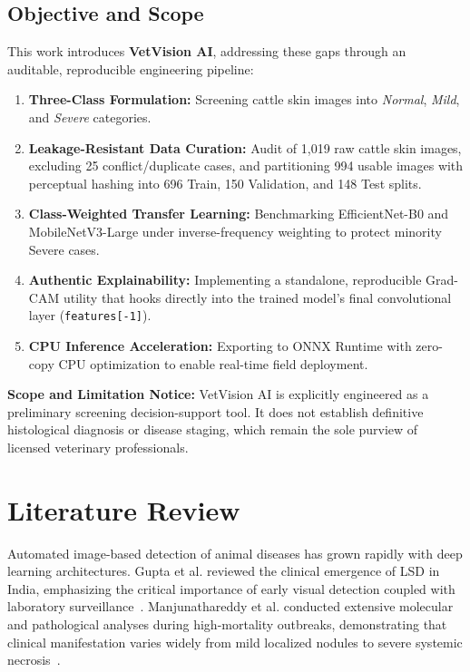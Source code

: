 \documentclass[conference]{IEEEtran}
\begin{document}
\subsection{Objective and Scope}
This work introduces \textbf{VetVision AI}, addressing these gaps through an auditable, reproducible engineering pipeline:
\begin{enumerate}
    \item \textbf{Three-Class Formulation:} Screening cattle skin images into \textit{Normal}, \textit{Mild}, and \textit{Severe} categories.
    \item \textbf{Leakage-Resistant Data Curation:} Audit of 1,019 raw cattle skin images, excluding 25 conflict/duplicate cases, and partitioning 994 usable images with perceptual hashing into 696 Train, 150 Validation, and 148 Test splits.
    \item \textbf{Class-Weighted Transfer Learning:} Benchmarking EfficientNet-B0 and MobileNetV3-Large under inverse-frequency weighting to protect minority Severe cases.
    \item \textbf{Authentic Explainability:} Implementing a standalone, reproducible Grad-CAM utility that hooks directly into the trained model's final convolutional layer (\texttt{features[-1]}).
    \item \textbf{CPU Inference Acceleration:} Exporting to ONNX Runtime with zero-copy CPU optimization to enable real-time field deployment.
\end{enumerate}

\textbf{Scope and Limitation Notice:} VetVision AI is explicitly engineered as a preliminary screening decision-support tool. It does not establish definitive histological diagnosis or disease staging, which remain the sole purview of licensed veterinary professionals.

\section{Literature Review}

Automated image-based detection of animal diseases has grown rapidly with deep learning architectures. Gupta et al. reviewed the clinical emergence of LSD in India, emphasizing the critical importance of early visual detection coupled with laboratory surveillance~\cite{gupta2020review}. Manjunathareddy et al. conducted extensive molecular and pathological analyses during high-mortality outbreaks, demonstrating that clinical manifestation varies widely from mild localized nodules to severe systemic necrosis~\cite{manjunathareddy2024pathological}.
\end{document}

